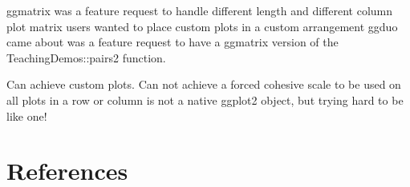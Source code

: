 \documentclass[article]{jss}
\begin{document}
  ggmatrix
    was a feature request to handle different length and different column plot matrix
    users wanted to place custom plots in a custom arrangement
  ggduo came about
    was a feature request to have a ggmatrix version of the TeachingDemos::pairs2 function.

Can achieve custom plots.
Can not achieve a forced cohesive scale to be used on all plots in a row or column
is not a native ggplot2 object, but trying hard to be like one!

\section[References]{References}

  
\end{document}
